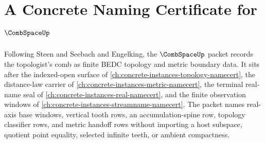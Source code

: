 \chapter{A Concrete Naming Certificate for $\CombSpaceUp$}
\label{ch:concrete-instances-comb-space-namecert}

Following Steen and Seebach and Engelking, the $\CombSpaceUp$ packet records the topologist's comb as finite BEDC topology and metric boundary data. It sits after the indexed-open surface of \autoref{ch:concrete-instances-topology-namecert}, the distance-law carrier of \autoref{ch:concrete-instances-metric-namecert}, the terminal real-name seal of \autoref{ch:concrete-instances-real-namecert}, and the finite observation windows of \autoref{ch:concrete-instances-streamname-namecert}. The packet names real-axis base windows, vertical tooth rows, an accumulation-spine row, topology classifier rows, and metric handoff rows without importing a host subspace, quotient point equality, selected infinite teeth, or ambient compactness.

